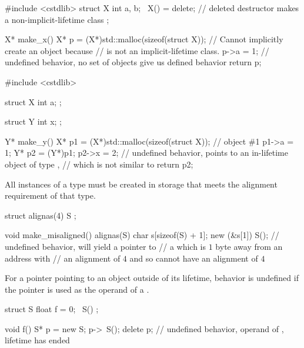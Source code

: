 \pnum
\begin{example}
\begin{codeblock}
#include <cstdlib>
struct X {
  int a, b;
  ~X() = delete;        // deleted destructor makes  a non-implicit-lifetime class
};

X* make_x() {
  X* p = (X*)std::malloc(sizeof(struct X));     // Cannot implicitly create an object because 
                                                // is not an implicit-lifetime class.
  p->a = 1;     // undefined behavior, no set of objects give us defined behavior
  return p;
}
\end{codeblock}
\end{example}
\begin{example}
\begin{codeblock}
#include <cstdlib>

struct X {
  int a;
};

struct Y {
  int x;
};

Y* make_y() {
  X* p1 = (X*)std::malloc(sizeof(struct X));    // object \#1
  p1->a = 1;
  Y* p2 = (Y*)p1;
  p2->x = 2;    // undefined behavior,  points to an in-lifetime object of type ,
                // which is not similar to 
  return p2;
}
\end{codeblock}
\end{example}

\pnum
All instances of a type must be created in storage
that meets the alignment requirement of that type.

\pnum
\begin{example}
\begin{codeblock}
struct alignas(4) S {};

void make_misaligned()
{
    alignas(S) char s[sizeof(S) + 1];
    new (&s[1]) S();    // undefined behavior,  will yield a pointer to
                        // a  which is $1$ byte away from an address with
                        // an alignment of $4$ and so cannot have an alignment of $4$
}
\end{codeblock}
\end{example}

\pnum
For a pointer pointing to an object outside of its lifetime,
behavior is undefined
if the pointer is used
as the operand of a .

\pnum
\begin{example}
\begin{codeblock}
struct S {
  float f = 0;
  ~S() {}
};

void f() {
  S* p = new S;
  p->~S();
  delete p;     // undefined behavior, operand of , lifetime has ended
}
\end{codeblock}
\end{example}

